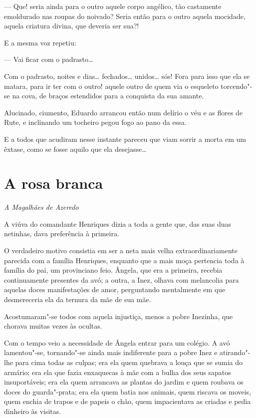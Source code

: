 --- Que! seria ainda para o outro aquele corpo angélico, tão castamente
emoldurado nas roupas do noivado? Seria então para o outro aquela
mocidade, aquela criatura divina, que deveria ser sua?!

E a mesma voz repetiu:

--- Vai ficar com o padrasto\ldots{}

Com o padrasto, noites e dias\ldots{} fechados\ldots{} unidos\ldots{} sós! Fora para
isso que ela se matara, para ir ter com o outro! aquele outro de quem
via o esqueleto torcendo"-se na cova, de braços estendidos para a
conquista da sua amante.

Alucinado, ciumento, Eduardo arrancou então num delírio o véu e as
flores de Rute, e inclinando um tocheiro pegou fogo ao pano da essa.

E a todos que acudiram nesse instante pareceu que viam sorrir a morta em
um êxtase, como se fosse aquilo que ela desejasse\ldots{}

\chapter{A rosa branca}

\hfill{}\emph{A Magalhães de Azeredo}

\bigskip

\noindent{}A viúva do comandante Henriques dizia a toda a gente que, das suas duas
netinhas, dava preferência à primeira.

O verdadeiro motivo consistia em ser a neta mais velha
extraordinariamente parecida com a família Henriques, enquanto que a
mais moça pertencia toda à família do pai, um provinciano feio. Ângela,
que era a primeira, recebia continuamente presentes da avó; a outra, a
Inez, olhava com melancolia para aquelas doces manifestações de amor,
perguntando mentalmente em que desmereceria ela da ternura da mãe de sua
mãe.

Acostumaram"-se todos com aquela injustiça, menos a pobre Inezinha, que
chorava muitas vezes às ocultas.

Com o tempo veio a necessidade de Ângela entrar para um colégio. A avó
lamentou"-se, tornando"-se ainda mais indiferente para a pobre Inez e
atirando"-lhe para cima todas as culpas; era ela quem quebrava a louça
que se sumia do armário; era ela que fazia enxaquecas à mãe com a bulha
dos seus sapatos insuportáveis; era ela quem arrancava as plantas do
jardim e quem roubava os doces do guarda"-prata; era ela quem batia nos
animais, quem riscava os moveis, quem enchia de trapos e de papeis o
chão, quem impacientava as criadas e pedia dinheiro às visitas.

